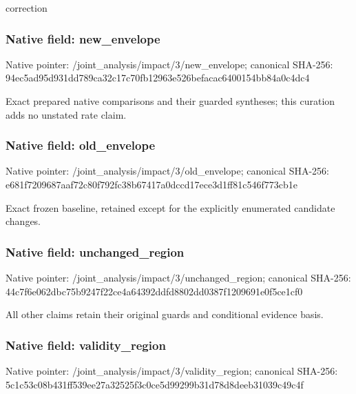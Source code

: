 \documentclass[10pt,a4paper]{article}
\begin{document}
\begingroup\raggedright\sloppy correction\par\endgroup

\subsubsection{Native field: new\_\allowbreak{}envelope}
Native pointer: /joint\_\allowbreak{}analysis/impact/3/new\_\allowbreak{}envelope; canonical SHA-256: 94ec5ad95d931dd789ca32c17c70fb12963e526befacac6400154bb84a0c4dc4

\begingroup\raggedright\sloppy Exact prepared native comparisons and their guarded syntheses;\allowbreak{} this curation adds no unstated rate claim.\par\endgroup

\subsubsection{Native field: old\_\allowbreak{}envelope}
Native pointer: /joint\_\allowbreak{}analysis/impact/3/old\_\allowbreak{}envelope; canonical SHA-256: e681f7209687aaf72c80f792fc38b67417a0dccd17ece3d1ff81c546f773cb1e

\begingroup\raggedright\sloppy Exact frozen baseline,\allowbreak{} retained except for the explicitly enumerated candidate changes.\par\endgroup

\subsubsection{Native field: unchanged\_\allowbreak{}region}
Native pointer: /joint\_\allowbreak{}analysis/impact/3/unchanged\_\allowbreak{}region; canonical SHA-256: 44c7f6e062dbc75b9247f22ce4a64392ddfd8802dd0387f1209691e0f5ce1cf0

\begingroup\raggedright\sloppy All other claims retain their original guards and conditional evidence basis.\par\endgroup

\subsubsection{Native field: validity\_\allowbreak{}region}
Native pointer: /joint\_\allowbreak{}analysis/impact/3/validity\_\allowbreak{}region; canonical SHA-256: 5c1c53c08b431ff539ee27a32525f3c0ce5d99299b31d78d8deeb31039c49c4f
\end{document}

